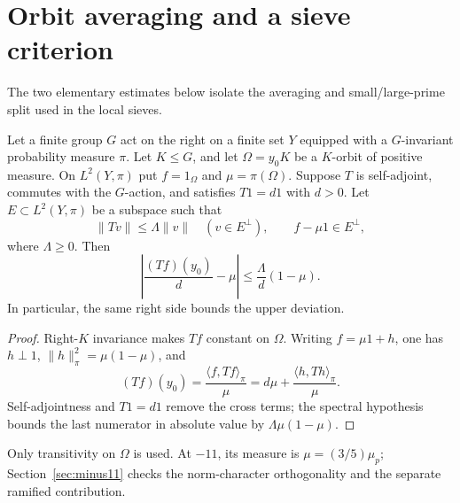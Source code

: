 \section{Orbit averaging and a sieve criterion}\label{sec:orbit-criterion}
The two elementary estimates below isolate the averaging and
small/large-prime split used in the local sieves.

\begin{proposition}\label{prop:orbit-averaging}
Let a finite group $G$ act on the right on a finite set $Y$ equipped
with a $G$-invariant probability measure $\pi$. Let $K\le G$, and let
$\Omega=y_0K$ be a $K$-orbit of positive measure. On $L^2(Y,\pi)$ put
$f=1_\Omega$ and $\mu=\pi(\Omega)$. Suppose $T$ is self-adjoint,
commutes with the $G$-action, and satisfies $T1=d1$ with $d>0$.
Let $E\subset L^2(Y,\pi)$ be a subspace such that
\[
\|Tv\|\le\Lambda\|v\|\quad(v\in E^\perp),\qquad
f-\mu1\in E^\perp,
\]
where $\Lambda\ge0$. Then
\[
\left|\frac{(Tf)(y_0)}d-\mu\right|
\le\frac\Lambda d(1-\mu).
\]
In particular, the same right side bounds the upper deviation.
\end{proposition}
\begin{proof}
Right-\(K\) invariance makes \(Tf\) constant on \(\Omega\).
Writing \(f=\mu1+h\), one has \(h\perp1\),
\(\|h\|_\pi^2=\mu(1-\mu)\), and
\[
 (Tf)(y_0)=\frac{\langle f,Tf\rangle_\pi}{\mu}
          =d\mu+\frac{\langle h,Th\rangle_\pi}{\mu}.
\]
Self-adjointness and \(T1=d1\) remove the cross terms; the spectral
hypothesis bounds the last numerator in absolute value by
\(\Lambda\mu(1-\mu)\).
\end{proof}
Only transitivity on \(\Omega\) is used. At \(-11\), its measure is
\(\mu=(3/5)\mu_p\); Section~\ref{sec:minus11} checks the norm-character
orthogonality and the separate ramified contribution.

